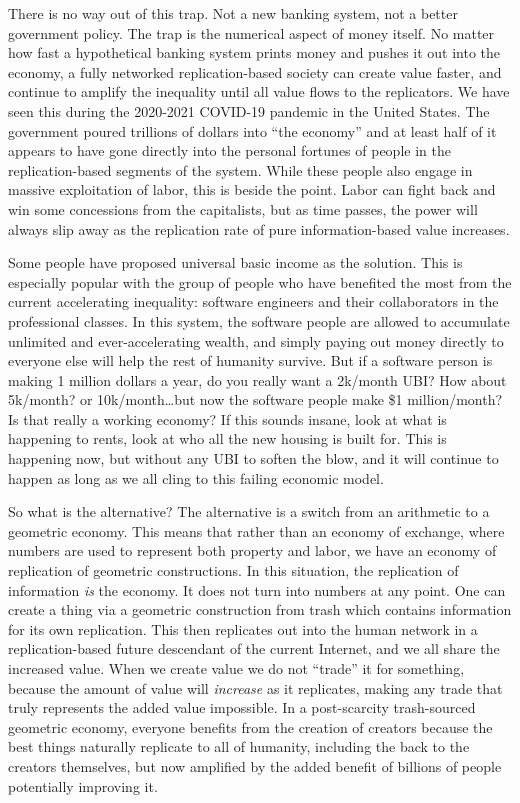 There is no way out of this trap. Not a new banking system, not a better
government policy. The trap is the numerical aspect of money itself. No
matter how fast a hypothetical banking system prints money and pushes it
out into the economy, a fully networked replication-based society can
create value faster, and continue to amplify the inequality until all
value flows to the replicators. We have seen this during the 2020-2021
COVID-19 pandemic in the United States. The government poured trillions
of dollars into ``the economy'' and at least half of it appears to have
gone directly into the personal fortunes of people in the
replication-based segments of the system. While these people also engage
in massive exploitation of labor, this is beside the point. Labor can
fight back and win some concessions from the capitalists, but as time
passes, the power will always slip away as the replication rate of pure
information-based value increases.



Some people have proposed universal basic income as the solution. This
is especially popular with the group of people who have benefited the
most from the current accelerating inequality: software engineers and
their collaborators in the professional classes. In this system, the
software people are allowed to accumulate unlimited and
ever-accelerating wealth, and simply paying out money directly to
everyone else will help the rest of humanity survive. But if a software
person is making 1 million dollars a year, do you really want a 2k/month
UBI? How about 5k/month? or 10k/month\ldots{}but now the software people
make \$1 million/month? Is that really a working economy? If this sounds
insane, look at what is happening to rents, look at who all the new
housing is built for. This is happening now, but without any UBI to
soften the blow, and it will continue to happen as long as we all cling
to this failing economic model.

So what is the alternative? The alternative is a switch from an
arithmetic to a geometric economy. This means that rather than an
economy of exchange, where numbers are used to represent both property
and labor, we have an economy of replication of geometric constructions.
In this situation, the replication of information \emph{is} the economy.
It does not turn into numbers at any point. One can create a thing via a
geometric construction from trash which contains information for its own
replication. This then replicates out into the human network in a
replication-based future descendant of the current Internet, and we all
share the increased value. When we create value we do not ``trade'' it
for something, because the amount of value will \emph{increase} as it
replicates, making any trade that truly represents the added value
impossible. In a post-scarcity trash-sourced geometric economy, everyone
benefits from the creation of creators because the best things naturally
replicate to all of humanity, including the back to the creators
themselves, but now amplified by the added benefit of billions of people
potentially improving it.

